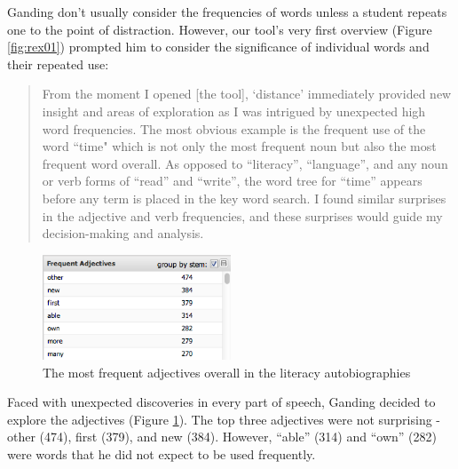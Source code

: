 \documentclass{sig-alternate}
\begin{document}
Ganding don't usually consider the frequencies of words unless a student repeats one to the point of distraction. However, our tool's very first overview (Figure \ref{fig:rex01}) prompted him to consider the significance of individual words and their repeated use:
\begin{quote}
From the moment I opened [the tool], `distance' immediately provided new insight and areas of exploration as I was intrigued by unexpected high word frequencies.  The most obvious example is the frequent use of the word ``time" which is not only the most frequent noun but also the most frequent word overall.  As opposed to ``literacy'', ``language'', and any noun or verb forms of ``read'' and ``write'', the word tree for ``time'' appears before any term is placed in the key word search.   I found similar surprises in the adjective and verb frequencies, and these surprises would guide my decision-making and analysis.
\end{quote}

\begin{figure}
\includegraphics[width=0.5\textwidth]{fig/rex/02.png}
\caption{The most frequent adjectives overall in the literacy autobiographies \label{fig:rex02}}
\end{figure}

Faced with unexpected discoveries in every part of speech, Ganding decided to explore the adjectives (Figure \ref{fig:rex02}). The top three adjectives were not surprising - other (474), first (379), and new (384).  However,  ``able'' (314) and ``own'' (282) were words that he did not expect to be used frequently.
\end{document}
